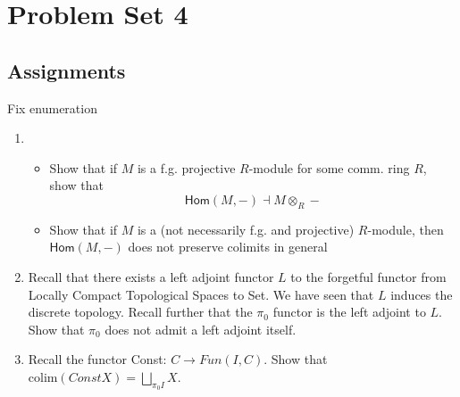 \documentclass{article}
\begin{document}
\section{Problem Set 4}
\subsection{Assignments}
\alert{Fix enumeration}
\begin{enumerate}
	\item \begin{itemize}[a.]
		\item Show that if $M$ is a f.g. projective $R$-module for some comm. ring $R$, show that $$\textsf{Hom}(M,-)\dashv M\otimes_R -$$
		\item Show that if $M$ is a (not necessarily f.g. and projective) $R$-module, then $\textsf{Hom}(M,-)$ does not preserve colimits in general
	\end{itemize}
	\item Recall that there exists a left adjoint functor $L$ to the forgetful functor from Locally Compact Topological Spaces to Set. We have seen that $L$ induces the discrete topology. Recall further that the $\pi_0$ functor is the left adjoint to $L$. Show that $\pi_0$ does not admit a left adjoint itself.
	\item Recall the functor Const: $C\to Fun(I,C)$. Show that $\text{colim}(Const X) = \bigsqcup_{\pi_0 I}X$.
\end{enumerate}


\end{document}
